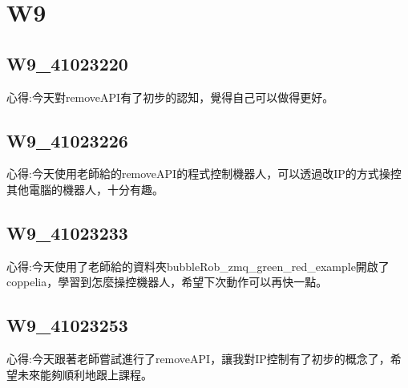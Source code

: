 \chapter{W9}


\section{W9\_41023220}

心得:今天對removeAPI有了初步的認知，覺得自己可以做得更好。

\section{W9\_41023226}

心得:今天使用老師給的removeAPI的程式控制機器人，可以透過改IP的方式操控其他電腦的機器人，十分有趣。

\section{W9\_41023233}

心得:今天使用了老師給的資料夾bubbleRob_zmq_green_red_example開啟了coppelia，學習到怎麼操控機器人，希望下次動作可以再快一點。

\section{W9\_41023253}

心得:今天跟著老師嘗試進行了removeAPI，讓我對IP控制有了初步的概念了，希望未來能夠順利地跟上課程。

